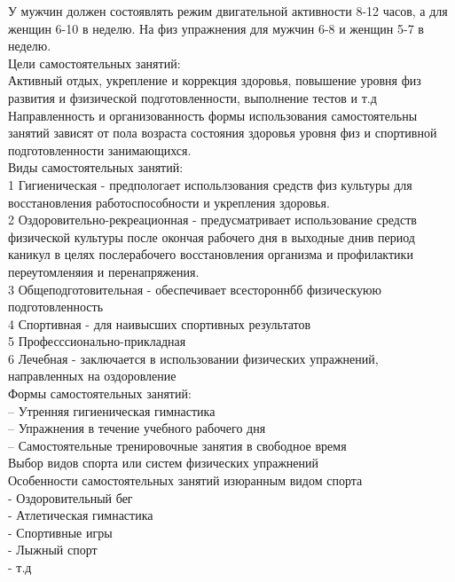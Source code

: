 \documentclass[a4paper, 12pt]{article}
\begin{document}
У мужчин должен состоявлять режим двигательной активности 8-12 часов, а для женщин 6-10 в неделю. На физ упражнения для мужчин 6-8 и женщин 5-7 в неделю.\\
Цели самостоятельных занятий:\\
Активный отдых, укрепление и коррекция здоровья, повышение уровня физ развития и фзизической подготовленности, выполнение тестов и т.д \\
Направленность и организованность формы использования самостоятельны занятий зависят от пола возраста состояния здоровья уровня физ и спортивной подготовленности занимающихся.\\

Виды самостоятельных занятий:\\
1 Гигиеническая - предпологает испольлзования средств физ культуры для восстановления работоспособности и укрепления здоровья.\\
2 Оздоровительно-рекреационная - предусматривает использование средств физической культуры после окончая рабочего дня в выходные днив период каникул в целях послерабочего восстановления организма и профилактики переутомленяия и перенапряжения.\\
3 Общеподготовительная - обеспечивает всестороннбб физическуюю подготовленность\\
4 Спортивная - для наивысших спортивных результатов\\
5 Професссионально-прикладная\\
6 Лечебная - заключается в использовании физических упражнений, направленных на оздоровление\\

Формы самостоятельных занятий:\\
-- Утренняя гигиеническая гимнастика\\
-- Упражнения в течение учебного рабочего дня\\
-- Самостоятельные тренировочные занятия в свободное время\\

Выбор видов спорта или систем физических упражнений\\

Особенности самостоятельных занятий изюранным видом спорта\\
- Оздоровительный бег\\
- Атлетическая гимнастика\\
- Спортивные игры\\
- Лыжный спорт\\
- т.д\\
\end{document}
